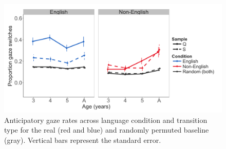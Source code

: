 \documentclass[authoryear, 12pt]{elsarticle}
\begin{document}
\begin{figure}[h]
\begin{center}
\includegraphics[width=1\textwidth]{figures/E1-samples-by-lang-groups-trans-types.png}
\end{center}
\caption{Anticipatory gaze rates across language condition and transition type for the real (red and blue) and randomly permuted baseline (gray). Vertical bars represent the standard error.} 
\label{fig:E1-randvsreal}
\end{figure}
\end{document}
